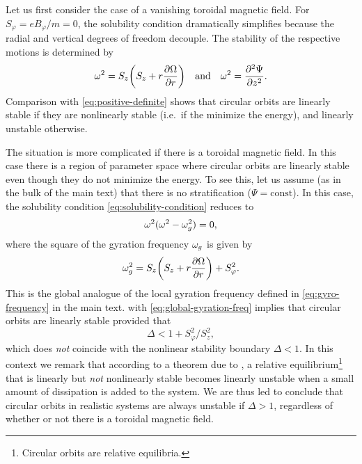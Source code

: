 \documentclass[aps,pre,notitlepage,amsmath,amssymb,amsfonts,nobibnotes,nofootinbib,superscriptaddress]{revtex4-1}
\begin{document}
Let us first consider the case of a vanishing toroidal magnetic field. For
$S_\varphi=eB_\varphi/m=0$, the solubility condition
 dramatically simplifies because the radial
and vertical degrees of freedom decouple. The stability of the respective
motions is determined by
\begin{equation}
  \omega^2 = S_z\left(S_z + r\pder{\Omega}{r}\right)
  \quad\textrm{and}\quad
  \omega^2 = \pdder{\Psi}{z}.
\end{equation}
Comparison with \cref{eq:positive-definite} shows that circular orbits are
linearly stable if they are nonlinearly stable (i.e.\ if the minimize the
energy), and linearly unstable otherwise.

The situation is more complicated if there is a toroidal magnetic field. In
this case there is a region of parameter space where circular orbits are
linearly stable even though they do not minimize the energy. To see this, let
us assume (as in the bulk of the main text) that there is no stratification
($\Psi=\mathrm{const}$). In this case, the solubility condition
\cref{eq:solubility-condition} reduces to
\begin{equation}
  \label{eq:solubility-no-stratification}
  \omega^2(\omega^2 - \omg^2) = 0,
\end{equation}
where the square of the gyration frequency $\omega_g$ is given by
\begin{equation}
  \label{eq:global-gyration-freq}
  \omg^2 = S_z\left(S_z + r\pder{\Omega}{r}\right) + S_\varphi^2.
\end{equation}
This is the global analogue of the local gyration frequency defined in
\cref{eq:gyro-frequency} in the main text.
 with \cref{eq:global-gyration-freq}
implies that circular orbits are linearly stable provided that
\begin{equation}
  \Delta < 1 + S_\varphi^2/S_z^2,
\end{equation}
which does \emph{not} coincide with the nonlinear stability boundary
$\Delta<1$. In this context we remark that according to a theorem due to
\citet{Bloch1994}, a relative equilibrium\footnote{Circular orbits are
  relative equilibria.} that is linearly but \emph{not} nonlinearly stable
becomes linearly unstable when a small amount of dissipation is added to the
system. We are thus led to conclude that circular orbits in realistic systems
are always unstable if $\Delta>1$, regardless of whether or not there is a
toroidal magnetic field.
\end{document}
